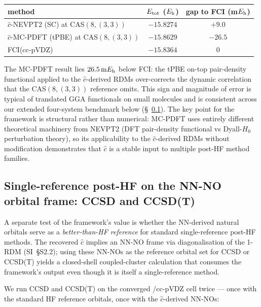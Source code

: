 \documentclass[journal=jctcce,manuscript=article,layout=traditional]{achemso}
\begin{document}
\begin{center}\renewcommand{\arraystretch}{1.05}\small
\begin{tabular}{lcc}
\toprule
method                    &  $E_{\rm tot}$ ($E_{\rm h}$)  & gap to FCI (m$E_{\rm h}$)  \\
\midrule
$\widehat c$-NEVPT2 (SC) at CAS$(8,(3,3))$
                          &  $-15.8274$  & $+9.0$  \\
$\widehat c$-MC-PDFT (tPBE) at CAS$(8,(3,3))$
                          &  $-15.8629$  & $-26.5$ \\
\midrule
FCI(cc-pVDZ)              &  $-15.8364$  & 0       \\
\bottomrule
\end{tabular}
\end{center}

\noindent The MC-PDFT result lies $26.5\,{\rm m}E_{\rm h}$ below
FCI: the tPBE on-top pair-density functional applied to the
$\widehat c$-derived RDMs over-corrects the dynamic correlation that
the CAS$(8,(3,3))$ reference omits. This sign and magnitude of error
is typical of translated GGA functionals on small molecules and is
consistent across our extended four-system benchmark below
(\S~\ref{sec:sr_post_hf}). The key point for the
framework is structural rather than numerical: MC-PDFT uses entirely
different theoretical machinery from NEVPT2 (DFT pair-density
functional vs Dyall-$H_0$ perturbation theory), so its applicability
to the $\widehat c$-derived RDMs without modification demonstrates
that $\widehat c$ is a stable input to multiple post-HF method
families.

\subsection{Single-reference post-HF on the NN-NO orbital frame:
            CCSD and CCSD(T)}
\label{sec:sr_post_hf}

A separate test of the framework's value is whether the NN-derived
natural orbitals serve as a \emph{better-than-HF reference} for
standard single-reference post-HF methods. The recovered $\widehat c$
implies an NN-NO frame via diagonalisation of the 1-RDM
(SI~\S S2.2); using these NN-NOs as the
reference orbital set for CCSD or CCSD(T) yields a closed-shell
coupled-cluster calculation that consumes the framework's output
even though it is itself a single-reference method.

We run CCSD and CCSD(T) on the converged /cc-pVDZ cell
twice --- once with the standard HF reference orbitals, once with
the $\widehat c$-derived NN-NOs:
\end{document}
